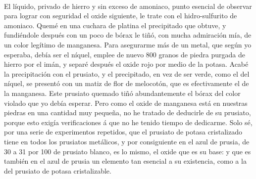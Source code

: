 \documentclass[a4paper, 12pt, oneside, spanish]{article}
\begin{document}
\paragraph{}
El líquido, privado de hierro y sin exceso de amoniaco, punto esencial de observar para lograr con seguridad el oxide siguiente, le trate con el hidro-sulfurito de amoniaco. Quemé en una cuchara de platina el precipitado que obtuve, y fundiéndole después con un poco de bórax le tiñó, con mucha admiración mía, de un color legítimo de manganesa. Para asegurarme más de un metal, que según yo esperaba, debía ser el níquel, emplee de nuevo 800 granos de piedra purgada de hierro por el imán, y separé después el oxide rojo por medio de la potasa. Acabé la precipitación con el prusiato, y el precipitado, en vez de ser verde, como el del níquel, se presentó con un matiz de flor de melocotón, que es efectivamente el de la manganesa. Este prusiato quemado tiñó abundantemente el bórax del color violado que yo debía esperar. Pero como el oxide de manganesa está en nuestras piedras en una cantidad muy pequeña, no he tratado de deducirle de su prusiato, porque esto exigía verificaciones á que no he tenido tiempo de dedicarme. Solo sé, por una serie de experimentos repetidos, que el prusiato de potasa cristalizado tiene en todos los prusiatos metálicos, y por consiguiente en el azul de prusia, de 30 a 31 por 100 de prusiato blanco, es lo mismo, el oxide que es su base: y que es también en el azul de prusia un elemento tan esencial a su existencia, como a la del prusiato de potasa cristalizable.
\end{document}
